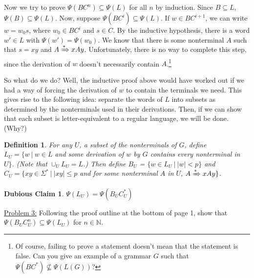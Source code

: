 \documentclass[11pt]{article}
\newtheorem{definition}[theorem]{Definition}
\newtheorem{badclaim}[theorem]{Dubious Claim}
\begin{document}
Now we try to prove $\Psi(BC^n) \subseteq \Psi(L)$ for all $n$ by induction. Since $B \subseteq L$, $\Psi(B) \subseteq \Psi(L)$. Now, suppose $\Psi(BC^i) \subseteq \Psi(L)$. If $w \in BC^{i+1}$, we can write $w = w_0s$, where $w_0 \in BC^i$ and $s \in C$. By the inductive hypothesis, there is a word $w' \in L$ with $\Psi(w') = \Psi(w_0)$.  We know that there is some nonterminal $A$ such that $s = xy$ and $A \xRightarrow{*} xAy$. Unfortunately, there is no way to complete this step, since the derivation of $w$ doesn't necessarily contain $A$.\footnote{Of course, failing to prove a statement doesn't mean that the statement is false. Can you give an example of a grammar $G$ such that $\Psi(BC^*) \not \subseteq \Psi(L(G))$?}
\hbreak \newline

So what do we do? Well, the inductive proof above would have worked out if we had a way of forcing the derivation of $w$ to contain the terminals we need. This gives rise to the following idea: separate the words of $L$ into subsets as determined by the nonterminals used in their derivations.  Then, if we can show that each subset is letter-equivalent to a regular language, we will be done. (Why?)

\begin{definition}
For any $U$, a subset of the nonterminals of $G$, define $L_U = \{w ~|~ w \in L$ and some derivation of $w$ by $G$ contains every nonterminal in $U\}$. (Note that $\cup_{U}L_U = L$.)  Then define $B_U$ = $\{w \in L_U ~|~ |w| < p\}$ and $C_U = \{xy \in \Sigma^* ~|~ |xy| \leq p$ and for some nonterminal $A$ in $U$, $A \xRightarrow{*} xAy\}$.
\end{definition}

\begin{badclaim}
$\Psi(L_U) = \Psi (B_UC_U^*)$
\end{badclaim}

\underline{Problem 3:} Following the proof outline at the bottom of page 1, show that $\Psi(B_UC_U^n) \subseteq \Psi(L_U)$ for $n \in \mathbb{N}$. \hbreak \newline
\end{document}
